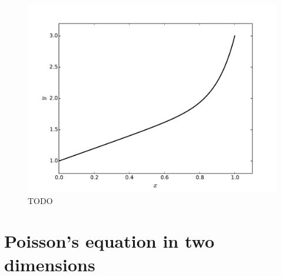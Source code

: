 \begin{figure}[ht]
\centering
\includegraphics[width=12cm]{figure2.pdf}
\caption{TODO}
\label{figure2}
\end{figure}



\section{Poisson's equation in two dimensions}


